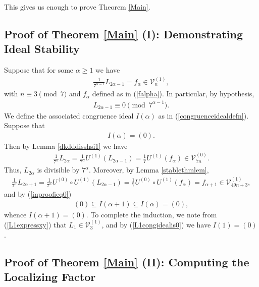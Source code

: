 \documentclass[reqno]{amsart}
\theoremstyle{definition}
\theoremstyle{remark}
\numberwithin{equation}{section}
\begin{document}
This gives us enough to prove Theorem \ref{Main}.

\subsection{Proof of Theorem \ref{Main} (I): Demonstrating Ideal Stability}

Suppose that for some $\alpha\ge 1$ we have
\begin{align*}
\frac{1}{7^{\alpha-1}}L_{2\alpha-1} = f_{\alpha}\in\mathcal{V}^{(1)}_{n},
\end{align*} with $n\equiv 3\pmod{7}$ and $f_{\alpha}$ defined as in (\ref{falpha}).  In particular, by hypothesis,
\begin{align*}
L_{2\alpha-1}\equiv 0\pmod{7^{\alpha-1}}.
\end{align*}  We define the associated congruence ideal $I(\alpha)$ as in (\ref{congruenceidealdefn}).  Suppose that
\begin{align}
I(\alpha)=(0).\label{inproofieq0}
\end{align}  Then by Lemma \ref{dkdddisshsi1} we have 
\begin{align*}
\frac{1}{7^{\alpha}}L_{2\alpha} = \frac{1}{7^{\alpha}}U^{(1)}\left( L_{2\alpha-1} \right) = \frac{1}{7}U^{(1)}\left( f_{\alpha} \right)\in\mathcal{V}^{(0)}_{7n}.
\end{align*}  Thus, $L_{2\alpha}$ is divisible by $7^{\alpha}$.  Moreover, by Lemma \ref{stablethmlem},
\begin{align*}
\frac{1}{7^{\alpha}}L_{2\alpha+1} = \frac{1}{7^{\alpha}}U^{(0)}\circ U^{(1)}\left( L_{2\alpha-1} \right) = \frac{1}{7}U^{(0)}\circ U^{(1)}\left( f_{\alpha} \right) = f_{\alpha+1}\in\mathcal{V}^{(1)}_{49n+3},
\end{align*} and by (\ref{inproofieq0})
\begin{align*}
(0)\subseteq I(\alpha+1)\subseteq I(\alpha)=(0),
\end{align*} whence $I(\alpha+1)=(0)$.  To complete the induction, we note from (\ref{L1expressxy}) that $L_{1}\in\mathcal{V}^{(1)}_{3}$, and by (\ref{L1congidealis0}) we have $I(1)=(0)$.

\subsection{Proof of Theorem \ref{Main} (II): Computing the Localizing Factor}
\end{document}

